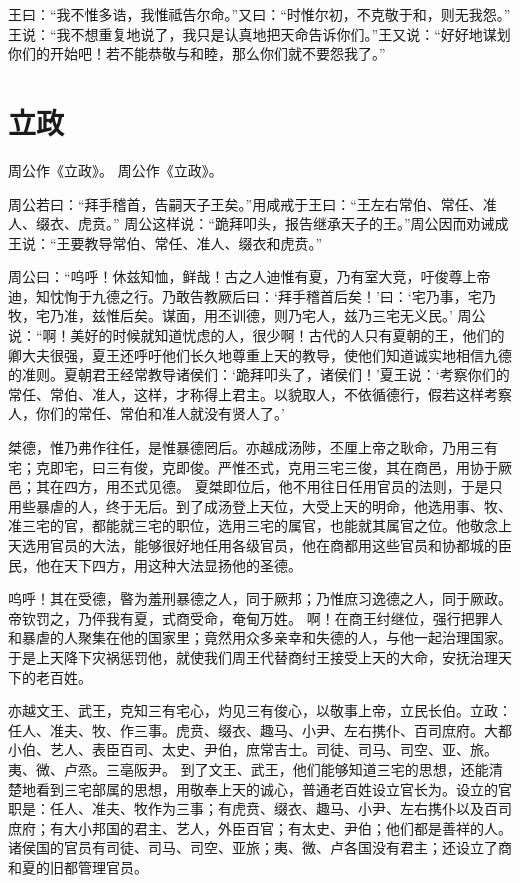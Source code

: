 \documentclass[12pt,UTF8]{ctexbook}
\begin{document}
王曰：“我不惟多诰，我惟祗告尔命。”又曰：“时惟尔初，不克敬于和，则无我怨。”
王说：“我不想重复地说了，我只是认真地把天命告诉你们。”王又说：“好好地谋划你们的开始吧！若不能恭敬与和睦，那么你们就不要怨我了。”

\chapter{立政}

周公作《立政》。
周公作《立政》。

周公若曰：“拜手稽首，告嗣天子王矣。”用咸戒于王曰：“王左右常伯、常任、准人、缀衣、虎贲。”
周公这样说：“跪拜叩头，报告继承天子的王。”周公因而劝诫成王说：“王要教导常伯、常任、准人、缀衣和虎贲。”

周公曰：“呜呼！休兹知恤，鲜哉！古之人迪惟有夏，乃有室大竞，吁俊尊上帝迪，知忱恂于九德之行。乃敢告教厥后曰：‘拜手稽首后矣！’曰：‘宅乃事，宅乃牧，宅乃准，兹惟后矣。谋面，用丕训德，则乃宅人，兹乃三宅无义民。’
周公说：“啊！美好的时候就知道忧虑的人，很少啊！古代的人只有夏朝的王，他们的卿大夫很强，夏王还呼吁他们长久地尊重上天的教导，使他们知道诚实地相信九德的准则。夏朝君王经常教导诸侯们：‘跪拜叩头了，诸侯们！’夏王说：‘考察你们的常任、常伯、准人，这样，才称得上君主。以貌取人，不依循德行，假若这样考察人，你们的常任、常伯和准人就没有贤人了。’

桀德，惟乃弗作往任，是惟暴德罔后。亦越成汤陟，丕厘上帝之耿命，乃用三有宅；克即宅，曰三有俊，克即俊。严惟丕式，克用三宅三俊，其在商邑，用协于厥邑；其在四方，用丕式见德。
夏桀即位后，他不用往日任用官员的法则，于是只用些暴虐的人，终于无后。到了成汤登上天位，大受上天的明命，他选用事、牧、准三宅的官，都能就三宅的职位，选用三宅的属官，也能就其属官之位。他敬念上天选用官员的大法，能够很好地任用各级官员，他在商都用这些官员和协都城的臣民，他在天下四方，用这种大法显扬他的圣德。

呜呼！其在受德，暋为羞刑暴德之人，同于厥邦；乃惟庶习逸德之人，同于厥政。帝钦罚之，乃伻我有夏，式商受命，奄甸万姓。
啊！在商王纣继位，强行把罪人和暴虐的人聚集在他的国家里；竟然用众多亲幸和失德的人，与他一起治理国家。于是上天降下灾祸惩罚他，就使我们周王代替商纣王接受上天的大命，安抚治理天下的老百姓。

亦越文王、武王，克知三有宅心，灼见三有俊心，以敬事上帝，立民长伯。立政：任人、准夫、牧、作三事。虎贲、缀衣、趣马、小尹、左右携仆、百司庶府。大都小伯、艺人、表臣百司、太史、尹伯，庶常吉士。司徒、司马、司空、亚、旅。夷、微、卢烝。三亳阪尹。
到了文王、武王，他们能够知道三宅的思想，还能清楚地看到三宅部属的思想，用敬奉上天的诚心，普通老百姓设立官长为。设立的官职是：任人、准夫、牧作为三事；有虎贲、缀衣、趣马、小尹、左右携仆以及百司庶府；有大小邦国的君主、艺人，外臣百官；有太史、尹伯；他们都是善祥的人。诸侯国的官员有司徒、司马、司空、亚旅；夷、微、卢各国没有君主；还设立了商和夏的旧都管理官员。
\end{document}
